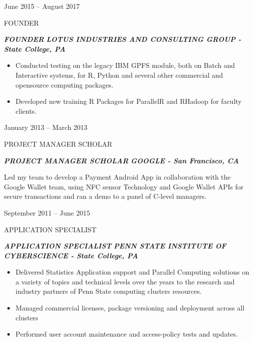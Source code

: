 \documentclass[a4paper,10pt]{article}
\newlength{\cvcolumngapwidth}
\newlength{\cvleftcolumnwidth}
\newlength{\cvrightcolumnwidth}
\newcommand{\cvtitlestyle}[1]{{\large\cvtitlefont\textcolor{cvtitlecolor}{#1}}}
\newcommand{\cvdurationstyle}[1]{{\small\cvdurationfont\textcolor{cvdurationcolor}{#1}}}
\newlength{\cvafteritemskipamount}
\newlength{\cvaftertitleskipamount}
\newlength{\cvparskip}
\newcommand{\cvitem}[2]{
    \begin{minipage}[t]{\cvleftcolumnwidth}
        \raggedleft #1
    \end{minipage}%
    \hspace{\cvcolumngapwidth}%
    \begin{minipage}[t]{\cvrightcolumnwidth}
        \setlength{\parskip}{\cvparskip} #2
    \end{minipage}

    \vspace{\cvafteritemskipamount}
}
\newcommand{\cvtitle}[1]{
    \cvtitlestyle{#1}

    \vspace{\cvaftertitleskipamount}
    \vspace{-\cvparskip}
}
\begin{document}
\cvitem{
    \cvdurationstyle{June 2015 -- August 2017}
}{
    \cvtitle{FOUNDER}

   \textcolor{cvwhatcolor}{\emph{\textbf{{FOUNDER}}}}
    \textcolor{cvwherecolor}{\textbf{\textbar}}
    \textcolor{cvwherecolor}{\emph{\textbf{LOTUS INDUSTRIES AND CONSULTING GROUP - State College, PA}}}

\begin{itemize}[leftmargin=*]
       \item Conducted testing on the legacy IBM GPFS module, both on Batch and Interactive systems, for R, Python and several other commercial and opensource computing packages.
       \item Developed new training R Packages for ParallelR and RHadoop for faculty clients.

   \end{itemize}



}


\cvitem{
    \cvdurationstyle{January 2013 -- March 2013}
}{
    \cvtitle{PROJECT MANAGER SCHOLAR}

   \textcolor{cvwhatcolor}{\emph{\textbf{{PROJECT MANAGER SCHOLAR}}}}
    \textcolor{cvwherecolor}{\textbf{\textbar}}
    \textcolor{cvwherecolor}{\emph{\textbf{GOOGLE - San Francisco, CA}}}


Led my team to develop a Payment Android App in collaboration with the Google Wallet team, using NFC sensor Technology and Google Wallet APIs for secure transactions and ran a demo to a panel of C-level managers.

}
\cvitem{
    \cvdurationstyle{September 2011 -- June 2015}
}{
    \cvtitle{APPLICATION SPECIALIST}

    \textcolor{cvwhatcolor}{\emph{\textbf{APPLICATION SPECIALIST}}}
    \textcolor{cvwherecolor}{\textbf{\textbar}}
    \textcolor{cvwherecolor}{\emph{\textbf{PENN STATE INSTITUTE OF CYBERSCIENCE - State College, PA}}}

 \begin{itemize}[leftmargin=*]
       \item   Delivered Statistics Application support and Parallel Computing solutions on a variety of topics and technical levels over the years to the research and industry partners of Penn State computing clusters resources.
       \item Managed commercial licenses, package versioning and deployment across all clusters
       \item Performed user account maintenance and access-policy tests and updates.


   \end{itemize}
}
\end{document}

